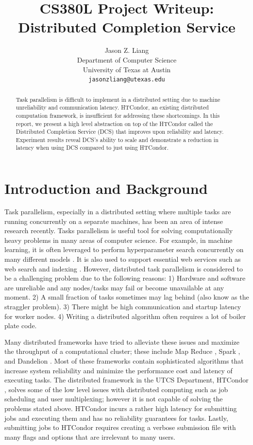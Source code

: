\documentclass{article}
\title{CS380L Project Writeup: Distributed Completion Service}
\author{
  Jason Z. Liang \\
  Department of Computer Science\\
  University of Texas at Austin \\
  \texttt{jasonzliang@utexas.edu} \\
}
\begin{document}
\maketitle

\begin{abstract}
  Task parallelism is difficult to implement in a distributed setting due to machine unreliability and communication latency. HTCondor, an existing distributed computation framework, is insufficient for addressing these shortcomings. In this report, we present a high level abstraction on top of the HTCondor called the Distributed Completion Service (DCS) that improves upon reliability and latency. Experiment results reveal DCS's ability to scale and demonstrate a reduction in latency when using DCS compared to just using HTCondor.
\end{abstract}

\section{Introduction and Background}

Task parallelism, especially in a distributed setting where multiple tasks are running concurrently on a separate machines, has been an area of intense research recently. Tasks parallelism is useful tool for solving computationally heavy problems in many areas of computer science. For example, in machine learning, it is often leveraged to perform hyperparameter search concurrently on many different models \cite{bergstra2013hyperopt}. It is also used to support essential web services such as web search and indexing \cite{boldi2004ubicrawler}. However, distributed task parallelism is considered to be a challenging problem due to the following reasons: 1) Hardware and software are unreliable and any nodes/tasks may fail or become unavailable at any moment. 2) A small fraction of tasks sometimes may lag behind (also know as the straggler problem). 3) There might be high communication and startup latency for worker nodes. 4) Writing a distributed algorithm often requires a lot of boiler plate code.

Many distributed frameworks have tried to alleviate these issues and maximize the throughput of a computational cluster; these include Map Reduce \cite{dean2008mapreduce}, Spark \cite{zaharia2010spark}, and Dandelion \cite{rossbach2013dandelion}. Most of these frameworks contain sophisticated algorithms that increase system reliability and minimize the performance cost and latency of executing tasks. The distributed framework in the UTCS Department, HTCondor \cite{thain2005distributed}, solves some of the low level issues with distributed computing such as job scheduling and user multiplexing; however it is not capable of solving the problems stated above. HTCondor incurs a rather high latency for submitting jobs and executing them and has no reliability guarantees for tasks. Lastly, submitting jobs to HTCondor requires creating a verbose submission file with many flags and options that are irrelevant to many users.
\end{document}
